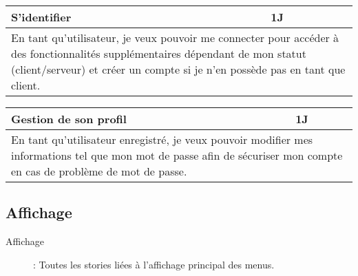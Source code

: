 \begin{center}
	\begin{tabular}{ll}
		\hline
			\multicolumn{1}{|p{14cm}|}{S'identifier} & \multicolumn{1}{p{0.7cm}|}{1J} \\ 
		\hline
			\multicolumn{2}{|p{15cm}|}{En tant qu'utilisateur, je veux pouvoir
			me connecter pour accéder à des fonctionnalités supplémentaires 
			dépendant de mon statut (client/serveur) et créer un compte si 
			je n'en possède pas en tant que client.} \\
		\hline
	\end{tabular}

	\vspace{1cm}
	
	\begin{tabular}{ll}
		\hline
			\multicolumn{1}{|p{14cm}|}{Gestion de son profil } & \multicolumn{1}{p{0.7cm}|}{1J} \\ 
		\hline
			\multicolumn{2}{|p{15cm}|}{En tant qu'utilisateur enregistré, je veux pouvoir
			modifier mes informations tel que mon mot de passe afin de sécuriser mon compte
			en cas de problème de mot de passe.} \\
		\hline
	\end{tabular}
\end{center}

\subsection{Affichage}
\begin{description}
	\item[Affichage] : Toutes les stories liées à l'affichage principal des menus.
\end{description}

